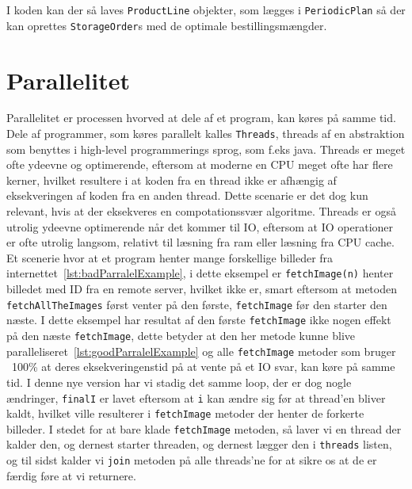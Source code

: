 I koden kan der så laves \verb|ProductLine| objekter, som lægges i \verb|PeriodicPlan| så der kan oprettes \verb|StorageOrder|s med de optimale bestillingsmængder. 

\section{Parallelitet}\label{ch:parallelitet}
Parallelitet er processen hvorved at dele af et program, kan køres på samme tid. Dele af programmer, som køres parallelt kalles \texttt{Threads}, threads af en abstraktion som benyttes i high-level programmerings sprog, som f.eks java. Threads er meget ofte ydeevne og optimerende, eftersom at moderne en CPU meget ofte har flere kerner, hvilket resultere i at koden fra en thread ikke er afhængig af eksekveringen af koden fra en anden thread. Dette scenarie er det dog kun relevant, hvis at der eksekveres en compotationssvær algoritme. Threads er også utrolig ydeevne optimerende når det kommer til IO, eftersom at IO operationer er ofte utrolig langsom, relativt til læsning fra ram eller læsning fra CPU cache. Et scenerie hvor at et program henter mange forskellige billeder fra internettet~\ref{lst:badParralelExample}, i dette eksempel er \texttt{fetchImage(n)} henter billedet med ID fra en remote server, hvilket ikke er, smart eftersom at metoden \texttt{fetchAllTheImages} først venter på den første, \texttt{fetchImage} før den starter den næste. I dette eksempel har resultat af den første \texttt{fetchImage} ikke nogen effekt på den næste \texttt{fetchImage}, dette betyder at den her metode kunne blive paralleliseret~\ref{lst:goodParralelExample} og alle \texttt{fetchImage} metoder som bruger ~100\% at deres eksekveringenstid på at vente på et IO svar, kan køre på samme tid. I denne nye version har vi stadig det samme loop, der er dog nogle ændringer, \texttt{finalI} er lavet eftersom at \texttt{i} kan ændre sig før at thread'en bliver kaldt, hvilket ville resulterer i \texttt{fetchImage} metoder der henter de forkerte billeder. I stedet for at bare klade \texttt{fetchImage} metoden, så laver vi en thread der kalder den, og dernest starter threaden, og dernest lægger den i \texttt{threads} listen, og til sidst kalder vi \texttt{join} metoden på alle threads'ne for at sikre os at de er færdig føre at vi returnere.


